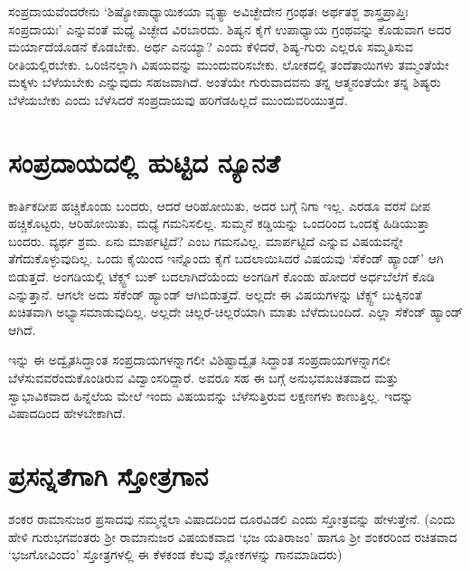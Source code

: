 ಸಂಪ್ರದಾಯವೆಂದರೇನು `ಶಿಷ್ಯೋಪಾಧ್ಯಾಯಿಕಯಾ ವೃತ್ಯಾ  ಅವಿಚ್ಛೇದೇನ ಗ್ರಂಥತಃ ಅರ್ಥತಶ್ಜ ಶಾಸ್ತ್ರಪ್ರಾಪ್ತಿಃ ಸಂಪ್ರದಾಯಃ' ಎನ್ನುವಂತೆ ಮಧ್ಯೆ ವಿಚ್ಛೇದ ವಿರಬಾರದು. ಶಿಷ್ಯನ ಕೈಗೆ ಉಪಾಧ್ಯಾಯ ಗ್ರಂಥವನ್ನು ಕೊಡುವಾಗ ಅದರ ಮರ್ಯಾದೆಯೊಡನೆ ಕೊಡಬೇಕು. ಅರ್ಥ ಎನಯ್ಯಾ? ಎಂದು ಕೆಳಿದರೆ, ಶಿಷ್ಯ-ಗುರು ಎಲ್ಲರೂ ಸಮ್ಮತಿಸುವ ರೀತಿಯಲ್ಲಿರಬೇಕು. ಒರಿಜಿನಲ್ಲಾಗಿ ವಿಷಯವನ್ನು ಮುಂದುವರಿಸಬೇಕು. ಲೋಕದಲ್ಲಿ ತಂದೆತಾಯಿಗಳು ತಮ್ಮಂತೆಯೇ ಮಕ್ಕಳು ಬೆಳೆಯಬೇಕು ಎನ್ನುವುದು ಸಹಜವಾಗಿದೆ. ಅಂತೆಯೇ ಗುರುವಾದವನು ತನ್ನ ಆತ್ಮನಂತೆಯೇ ತನ್ನ ಶಿಷ್ಯರು ಬೆಳೆಯಬೇಕು ಎಂದು ಬೆಳೆಸಿದರೆ ಸಂಪ್ರದಾಯವು ಹರಿಗೆಡಹಿಲ್ಲದೆ ಮುಂದುವರಿಯುತ್ತದೆ. 

\section*{ಸಂಪ್ರದಾಯದಲ್ಲಿ ಹುಟ್ಟಿದ ನ್ಯೂನತೆ}

ಕಾರ್ತಿಕದೀಪ ಹಚ್ಚಿಕೊಂಡು ಬಂದರು, ಆದರೆ ಆರಿಹೋಯಿತು, ಅದರ ಬಗ್ಗೆ ನಿಗಾ ಇಲ್ಲ. ಎರಡೂ ವರಸೆ ದೀಪ ಹಚ್ಚಿಕೊಟ್ಟರು, ಆರಿಹೋಯಿತು, ಮಧ್ಯೆ ಗಮನಿಸಲಿಲ್ಲ. ಸುಮ್ಮನೆ ಕಡ್ಡಿಯನ್ನು ಒಂದರಿಂದ ಒಂದಕ್ಕೆ ಹಿಡಿಯುತ್ತಾ ಬಂದರು. ವ್ಯರ್ಥ ಶ್ರಮ. ಏನು ಮಾರ್ಪಟ್ಟಿದೆ? ಎಂಬ ಗಮನವಿಲ್ಲ. ಮಾರ್ಪಟ್ಟಿದೆ ಎನ್ನುವ ವಿಷಯವನ್ನೇ ತೆಗೆದುಕೊಳ್ಳುವುದಿಲ್ಲ. ಒಂದು ಕೈಯಿಂದ ಇನ್ನೊಂದು ಕೈಗೆ ಬದಲಾಯಿಸಿದರೆ ವಿಷಯವು `ಸೆಕೆಂಡ್ ಹ್ಯಾಂಡ್' ಆಗಿ ಬಿಡುತ್ತದೆ. ಅಂಗಡಿಯಲ್ಲಿ ಟೆಕ್ಸ್ಟ್  ಬುಕ್ ಬದಲಾಗಿದೆಯೆಂದು ಅಂಗಡಿಗೆ ಕೊಂಡು ಹೋದರೆ ಅರ್ಧಬೆಲೆಗೆ ಕೊಡಿ ಎನ್ನುತ್ತಾನೆ. ಆಗಲೇ ಅದು ಸೆಕೆಂಡ್ ಹ್ಯಾಂಡ್ ಆಗಿಬಿಡುತ್ತದೆ. ಅಲ್ಲದೇ ಈ ವಿಷಯಗಳನ್ನು ಟೆಕ್ಸ್ಟ್ ಬುಕ್ಕಿನಂತೆ ಖಚಿತವಾಗಿ ಅಭ್ಯಾಸಮಾಡುವುದಿಲ್ಲ. ಅಲ್ಲದೇ ಚಿಲ್ಲರೆ-ಚಿಲ್ಲರೆಯಾಗಿ ಮಾತು ಬೆಳೆದುಬಂದಿದೆ. ಎಲ್ಲಾ ಸೆಕೆಂಡ್ ಹ್ಯಾಂಡ್ ಆಗಿದೆ.

ಇನ್ನು ಈ ಅದ್ವೈತಸಿದ್ಧಾಂತ ಸಂಪ್ರದಾಯಗಳನ್ನಾಗಲೀ ವಿಶಿಷ್ಟಾದ್ವೈತ ಸಿದ್ಧಾಂತ ಸಂಪ್ರದಾಯಗಳನ್ನಾಗಲೀ ಬೆಳೆಸುವವರೆಂದುಕೊಂಡಿರುವ ವಿದ್ವಾಂಸರಿದ್ದಾರೆ. ಅವರೂ ಸಹ ಈ ಬಗ್ಗೆ ಅನುಭವಖಚಿತವಾದ ಮತ್ತು ಸ್ವಾಭಾವಿಕವಾದ ಹಿನ್ನೆಲೆಯ ಮೇಲೆ ಇಂದು ವಿಷಯವನ್ನು ಬೆಳೆಸುತ್ತಿರುವ ಲಕ್ಷಣಗಳು ಕಾಣುತ್ತಿಲ್ಲ. ಇದನ್ನು ವಿಷಾದದಿಂದ ಹೇಳಬೇಕಾಗಿದೆ.

\section*{ಪ್ರಸನ್ನತೆಗಾಗಿ ಸ್ತೋತ್ರಗಾನ}

ಶಂಕರ ರಾಮಾನುಜರ ಪ್ರಸಾದವು ನಮ್ಮನ್ನೆಲಾ ವಿಷಾದದಿಂದ ದೂರವಿಡಲಿ ಎಂದು ಸ್ತೋತ್ರವನ್ನು ಹೇಳುತ್ತೇನೆ. (ಎಂದು ಹೇಳಿ ಗುರುಭಗವಂತರು ಶ್ರೀ ರಾಮಾನುಜರ ವಿಷಯಕವಾದ `ಭಜ ಯತಿರಾಜಂ' ಹಾಗೂ ಶ್ರೀ ಶಂಕರರಿಂದ ರಚಿತವಾದ `ಭಜಗೋವಿಂದಂ' ಸ್ತೋತ್ರಗಳಲ್ಲಿ ಈ ಕೆಳಕಂಡ ಕೆಲವು ಶ್ಲೋಕಗಳನ್ನು ಗಾನಮಾಡಿದರು)

